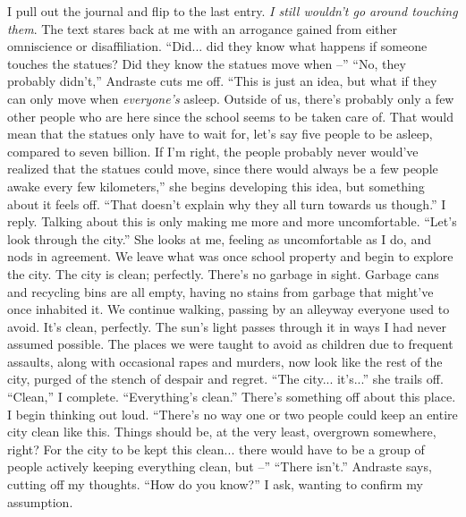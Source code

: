 \documentclass[a4paper, 12pt]{book}
\newcommand\tab[1][1cm]{\hspace*{#1}}
\begin{document}
\tab
I pull out the journal and flip to the last entry. \textit{I still wouldn’t go around touching them}. The text stares back at me with an arrogance gained from either omniscience or disaffiliation. ``Did... did they know what happens if someone touches the statues? Did they know the statues move when --''
\newline
\tab
``No, they probably didn’t,'' Andraste cuts me off. ``This is just an idea, but what if they can only move when \textit{everyone’s} asleep. Outside of us, there’s probably only a few other people who are here since the school seems to be taken care of. That would mean that the statues only have to wait for, let’s say five people to be asleep, compared to seven billion. If I’m right, the people probably never would’ve realized that the statues could move, since there would always be a few people awake every few kilometers,'' she begins developing this idea, but something about it feels off.
\newline
\tab
``That doesn’t explain why they all turn towards us though.'' I reply. Talking about this is only making me more and more uncomfortable. ``Let’s look through the city.''
\newline
\tab
She looks at me, feeling as uncomfortable as I do, and nods in agreement. We leave what was once school property and begin to explore the city. The city is clean; perfectly. There’s no garbage in sight. Garbage cans and recycling bins are all empty, having no stains from garbage that might’ve once inhabited it. We continue walking, passing by an alleyway everyone used to avoid. It’s clean, perfectly. The sun’s light passes through it in ways I had never assumed possible. The places we were taught to avoid as children due to frequent assaults, along with occasional rapes and murders, now look like the rest of the city, purged of the stench of despair and regret. ``The city... it’s...'' she trails off.
\newline
\tab
``Clean,'' I complete. ``Everything’s clean.'' There’s something off about this place. I begin thinking out loud. ``There’s no way one or two people could keep an entire city clean like this. Things should be, at the very least, overgrown somewhere, right? For the city to be kept this clean... there would have to be a group of people actively keeping everything clean, but --'' 
\newline
\tab
``There isn’t.'' Andraste says, cutting off my thoughts.
\newline
\tab
``How do you know?'' I ask, wanting to confirm my assumption.
\end{document}
